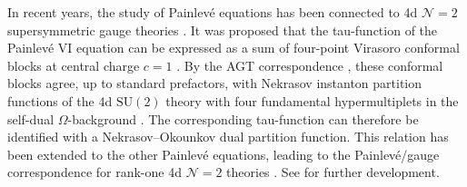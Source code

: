 \documentclass[11pt, a4paper]{article}
\theoremstyle{definition}
\begin{document}
In recent years, the study of Painlev\'e equations has been connected to 4d $ \mathcal{N}=2 $ supersymmetric gauge theories \cite{Gamayun:2012ma, Gamayun:2013auu, Bonelli:2016qwg}. It was proposed that the tau-function of the Painlev\'e VI equation can be expressed as a sum of four-point Virasoro conformal blocks at central charge $ c=1 $ \cite{Gamayun:2012ma}. By the AGT correspondence \cite{Alday:2009aq}, these conformal blocks agree, up to standard prefactors, with Nekrasov instanton partition functions of the 4d $\mathrm{SU}(2)$ theory with four fundamental hypermultiplets in the self-dual $\Omega$-background \cite{Nekrasov:2002qd, Nekrasov:2003rj}. The corresponding tau-function can therefore be identified with a Nekrasov--Okounkov dual partition function. This relation has been extended to the other Painlev\'e equations, leading to the Painlev\'e/gauge correspondence for rank-one 4d $\mathcal N=2$ theories \cite{Gamayun:2013auu,Bonelli:2016qwg}. See \cite{Gavrylenko:2016zlf,Gavrylenko:2017lqz,Grassi:2018spf,Bonelli:2019boe,Bonelli:2019yjd,Bonelli:2021rrg,Francois:2023trm} for further development.
\end{document}
